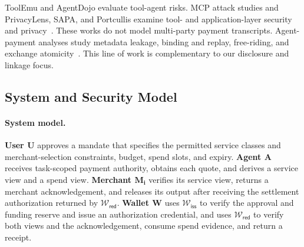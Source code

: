 \documentclass[letterpaper]{article}
\begin{document}
ToolEmu and AgentDojo evaluate tool-agent risks. MCP attack studies and
PrivacyLens, SAPA, and Portcullis examine tool- and application-layer security
and privacy~\cite{ruan2024toolemu,debenedetti2024agentdojo,wang2026mpma,
wang2026mcptox,shao2024privacylens,lin2026sapa,zhan2025portcullis}. These
works do not model multi-party payment transcripts. Agent-payment analyses study metadata leakage, binding and replay,
free-riding, and exchange atomicity~\cite{x402pii,x402attacks,x402freeriding,a402}.
This line of work is complementary to our disclosure and linkage focus.

\subsection{System and Security Model}
\label{sec:system-security-model}

\paragraph{System model.}
\textbf{User \(\mathbf{U}\)} approves a mandate that specifies the permitted service
classes and merchant-selection constraints, budget, spend slots, and expiry.
\textbf{Agent \(\mathbf{A}\)}
receives task-scoped payment authority, obtains each quote, and derives a
service view and a spend view.
\textbf{Merchant \(\mathbf{M_i}\)} verifies its service view, returns a
merchant acknowledgement, and releases its output after receiving the settlement
authorization returned by \(\mathcal{W}_{\mathsf{red}}\).
\textbf{Wallet \(\mathbf{W}\)} uses \(\mathcal{W}_{\mathsf{iss}}\) to verify the approval and
funding reserve and issue an authorization credential, and uses \(\mathcal{W}_{\mathsf{red}}\) to
verify both views and the acknowledgement, consume spend evidence, and
return a receipt.
\end{document}

